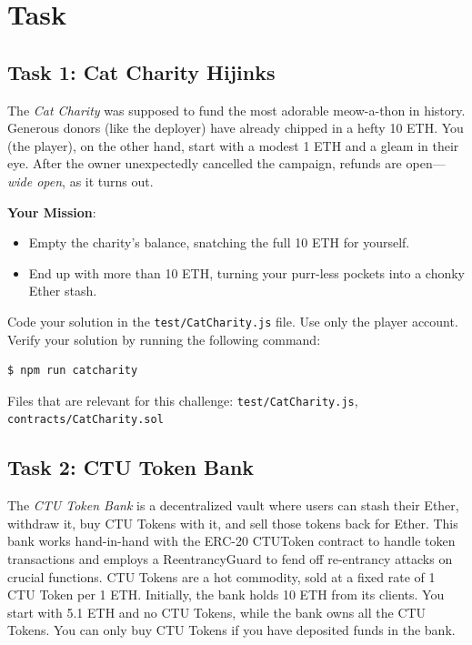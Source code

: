 \documentclass[12pt]{article}
\begin{document}
\section{Task}

\subsection*{Task 1: Cat Charity Hijinks}

The \emph{Cat Charity} was supposed to fund the most adorable meow-a-thon in
history. Generous donors (like the deployer) have already chipped in a hefty 10
ETH. You (the player), on the other hand, start with a modest 1 ETH and a gleam
in their eye. After the owner unexpectedly cancelled the campaign, refunds are
open—\emph{wide open}, as it turns out.

\medskip
\noindent
\textbf{Your Mission}:
\begin{itemize}
    \item Empty the charity's balance, snatching the full 10 ETH for yourself.
    \item End up with more than 10 ETH, turning your purr-less pockets into a chonky
          Ether stash.
\end{itemize}

\noindent
Code your solution in the \texttt{test/CatCharity.js} file. Use only the player account. Verify your solution by running the following command:

\begin{verbatim}
$ npm run catcharity
\end{verbatim}

\noindent
Files that are relevant for this challenge: \texttt{test/CatCharity.js}, \texttt{contracts/CatCharity.sol}

\subsection*{Task 2: CTU Token Bank}

The \emph{CTU Token Bank} is a decentralized vault where users can stash their
Ether, withdraw it, buy CTU Tokens with it, and sell those tokens back for
Ether. This bank works hand-in-hand with the ERC-20 CTUToken contract to handle
token transactions and employs a ReentrancyGuard to fend off re-entrancy
attacks on crucial functions. CTU Tokens are a hot commodity, sold at a fixed
rate of 1 CTU Token per 1 ETH. Initially, the bank holds 10 ETH from its
clients. You start with 5.1 ETH and no CTU Tokens, while the bank owns all the
CTU Tokens. You can only buy CTU Tokens if you have deposited funds in the
bank.
\end{document}
